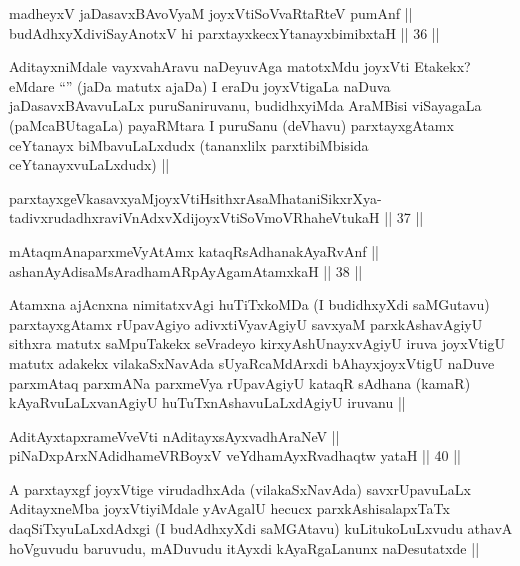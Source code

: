
\begin{shl}
madheyxV jaDasavxBAvoV\s yaM joyxVtiSoVvaRtaRteV pumAnf || \\
budAdhxyXdiviSayAnotxV hi parxtayxkecxYtanayxbimibxtaH ||  36 ||  
\end{shl}

\begin{artha}
AditayxniMdale vayxvahAravu naDeyuvAga matotxMdu joyxVti Etakekx? eMdare ``\stext'' (jaDa matutx ajaDa) I eraDu joyxVtigaLa naDuva jaDasavxBAvavuLaLx puruSaniruvanu, budidhxyiMda AraMBisi viSayagaLa (paMcaBUtagaLa) payaRMtara I puruSanu (deVhavu) parxtayxgAtamx ceYtanayx biMbavuLaLxdudx (tananxlilx parxtibiMbisida ceYtanayxvuLaLxdudx) ||
\end{artha}


\begin{shl}
parxtayxgeVkasavxyaMjoyxVtiHsithxrAsaMhataniSikxrXya-\\
tadivxrudadhxraviVnAdxvXdijoyxVtiSoVmoVRhaheVtukaH ||  37 ||  
\end{shl}
				
\begin{shl}
mAtaqmAnaparxmeVyAtAmx kataqRsAdhanakAyaRvAnf ||  \\
ashanAyAdisaMsAradhamARpAyAgamAtamxkaH ||  38 || 
\end{shl}

\begin{artha}
Atamxna ajAcnxna nimitatxvAgi huTiTxkoMDa (I budidhxyXdi saMGutavu) parxtayxgAtamx rUpavAgiyo adivxtiVyavAgiyU savxyaM parxkAshavAgiyU sithxra matutx saMpuTakekx seVradeyo kirxyAshUnayxvAgiyU iruva joyxVtigU matutx adakekx vilakaSxNavAda sUyaRcaMdArxdi bAhayxjoyxVtigU naDuve parxmAtaq parxmANa parxmeVya rUpavAgiyU kataqR sAdhana (kamaR) kAyaRvuLaLxvanAgiyU huTuTxnAshavuLaLxdAgiyU iruvanu ||
\end{artha}


\begin{shl}
AditAyxtapxrameVveVti nA\s \s ditayxsAyxvadhAraNeV || \\
piNaDxpArxNAdidhameVRBoyxV veYdhamAyxRvadhaqtw yataH ||  40 ||  
\end{shl}

\begin{artha}
A parxtayxgf joyxVtige virudadhxAda (vilakaSxNavAda) savxrUpavuLaLx AditayxneMba joyxVtiyiMdale yAvAgalU hecucx parxkAshisalapxTaTx daqSiTxyuLaLxdAdxgi (I budAdhxyXdi saMGAtavu) kuLitukoLuLxvudu athavA hoVguvudu baruvudu, mADuvudu itAyxdi kAyaRgaLanunx naDesutatxde ||
\end{artha}

